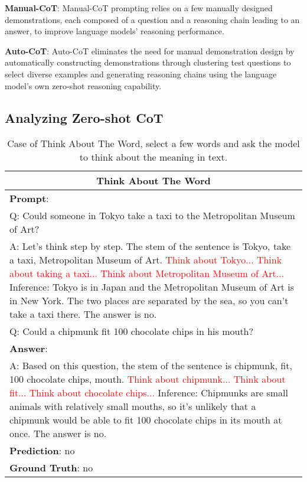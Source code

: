 \documentclass[11pt]{article}
\begin{document}
\noindent
\textbf{Manual-CoT}: Manual-CoT prompting relies on a few manually designed demonstrations, each composed of a question and a reasoning chain leading to an answer, to improve language models' reasoning performance.

\noindent
\textbf{Auto-CoT}: Auto-CoT eliminates the need for manual demonstration design by automatically constructing demonstrations through clustering test questions to select diverse examples and generating reasoning chains using the language model's own zero-shot reasoning capability.

\subsection{Analyzing Zero-shot CoT}
\begin{table*}[t]
\small
  \caption{Case of Think About The Word, select a few words and ask the model to think about the meaning in text.}
  \label{Think}
  \begin{tabularx}{\textwidth}{X}
    \toprule
    \multicolumn{1}{c}{\textbf{Think About The Word}} \\
    \midrule
    \textbf{Prompt}: \\
    Q: Could someone in Tokyo take a taxi to the Metropolitan Museum of Art?\\
    A: Let's think step by step. The stem of the sentence is Tokyo, take a taxi, Metropolitan Museum of Art. \textcolor{red}{Think about Tokyo... Think about taking a taxi... Think about Metropolitan Museum of Art...} Inference: Tokyo is in Japan and the Metropolitan Museum of Art is in New York. The two places are separated by the sea, so you can't take a taxi there. The answer is no. \\
    \midrule
    Q: Could a chipmunk fit 100 chocolate chips in his mouth?\\
    \textbf{Answer}:\\
    A: Based on this question, the stem of the sentence is chipmunk, fit, 100 chocolate chips, mouth. \textcolor{red}{Think about chipmunk... Think about fit... Think about chocolate chips...} Inference: Chipmunks are small animals with relatively small mouths, so it's unlikely that a chipmunk would be able to fit 100 chocolate chips in its mouth at once. The answer is no.\\
    \textbf{Prediction}: no\\
    \textbf{Ground Truth}: no\\
    \bottomrule
  \end{tabularx}
\end{table*}
\end{document}
